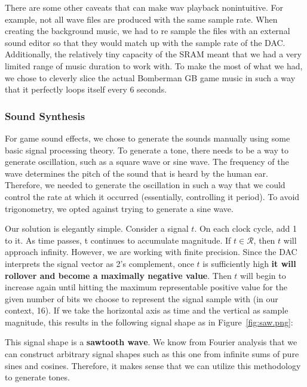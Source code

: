 \documentclass[10pt,a4paper]{article}
\begin{document}
There are some other caveats that can make wav playback nonintuitive. For example, not all wave files are produced with the same sample rate. When creating the background music, we had to re sample the files with an external sound editor so that they would match up with the sample rate of the DAC. Additionally, the relatively tiny capacity of the SRAM meant that we had a very limited range of music duration to work with. To make the most of what we had, we chose to cleverly slice the actual Bomberman GB game music in such a way that it perfectly loops itself every 6 seconds.

\subsubsection{Sound Synthesis}
For game sound effects, we chose to generate the sounds manually using some basic signal processing theory. To generate a tone, there needs to be a way to generate oscillation, such as a square wave or sine wave. The frequency of the wave determines the pitch of the sound that is heard by the human ear. Therefore, we needed to generate the oscillation in such a way that we could control the rate at which it occurred (essentially, controlling it period). To avoid trigonometry, we opted against trying to generate a sine wave.

Our solution is elegantly simple. Consider a signal $t$. On each clock cycle, add 1 to it. As time passes, t continues to accumulate magnitude. If $t \in \mathcal{R}$, then $t$ will approach infinity. However, we are working with finite precision. Since the DAC interprets the signal vector as 2's complement, once $t$ is sufficiently high \textbf{it will rollover and become a maximally negative value}. Then $t$ will begin to increase again until hitting the maximum representable positive value for the given number of bits we choose to represent the signal sample with (in our context, 16). If we take the horizontal axis as time and the vertical as sample magnitude, this results in the following signal shape as in Figure~\ref{fig:saw.png}:


This signal shape is a \textbf{sawtooth wave}. We know from Fourier analysis that we can construct arbitrary signal shapes such as this one from infinite sums of pure sines and cosines. Therefore, it makes sense that we can utilize this methodology to generate tones.
\end{document}
